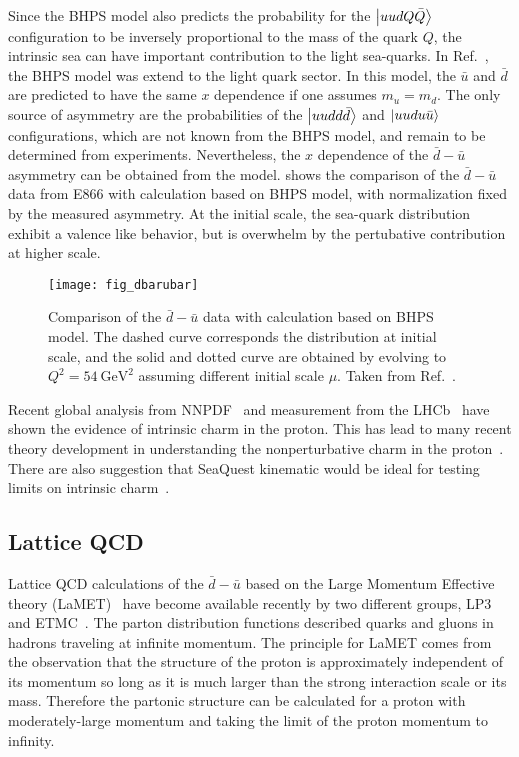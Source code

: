 \documentclass[../main.tex]{subfiles}
\begin{document}
Since the BHPS model also predicts the probability for the $\ket{uudQ\bar{Q}}$ configuration to
be inversely proportional to the mass of the quark $Q$, the intrinsic sea can have important
contribution to the light sea-quarks. In Ref.~\cite{chang2011,chang2011a}, the BHPS model
was extend to the light quark sector. In this model, the $\bar{u}$ and $\bar{d}$ are predicted
to  have the same $x$ dependence if one assumes $m_u=m_d$. The only source of asymmetry
are the probabilities of the $\ket{uudd\bar{d}}$ and $\ket{uudu\bar{u}}$ configurations,
which are not known from the BHPS model, and remain to be determined from experiments.
Nevertheless, the $x$ dependence of the $\bar{d}-\bar{u}$ asymmetry can be obtained from the model.
 shows the comparison of the $\bar{d}-\bar{u}$ data from E866 with calculation
based on BHPS model, with normalization fixed by the measured asymmetry. At the initial scale,
the sea-quark distribution exhibit a valence like behavior, but is overwhelm by the pertubative
contribution at higher scale.
\begin{figure}
	\centering
	\texttt{[image: fig\_dbarubar]}
	\caption{Comparison of the $\bar{d}-\bar{u}$ data with calculation based on BHPS model.
		The dashed curve corresponds the distribution at initial scale, and the solid and dotted
		curve are obtained by evolving to $Q^2=\SI{54}{\GeV\squared}$ assuming different initial scale $\mu$.
		Taken from Ref.~\cite{chang2011}. }
	\label{fig:five_quark}
\end{figure}

Recent global analysis from NNPDF~\cite{ball2022} and measurement from the LHCb~\cite{aaij2022}
have shown the evidence of intrinsic charm in the proton. This has lead to many recent theory
development in understanding the nonperturbative charm in the proton~\cite{guzzi2023}. There are
also suggestion that SeaQuest kinematic would be ideal for testing limits on intrinsic charm~\cite{vogt2021}.

\subsection{Lattice QCD}
Lattice QCD calculations of the $\bar{d} - \bar{u}$ based on the Large Momentum Effective
theory (LaMET)~\cite{ji2021,constantinou2021} have become available recently by two different groups,
LP3~\cite{chen2018} and ETMC~\cite{alexandrou2018}.
The parton distribution functions described quarks and gluons in hadrons traveling at infinite
momentum. The principle for LaMET comes from the observation that the structure of the proton is
approximately independent of its momentum so long as it is much larger than the strong interaction
scale or its mass. Therefore the partonic structure can be calculated for a proton with
moderately-large momentum and taking the limit of the proton momentum to infinity.
\end{document}
